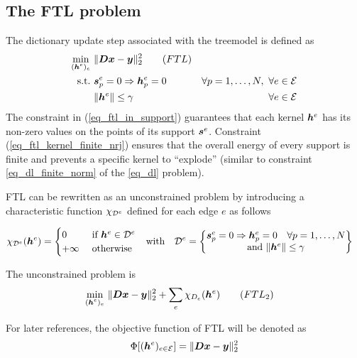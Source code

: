 \subsection{The \acs{FTL} problem}

The dictionary update step associated with the \gls{treemodel} is defined as
\begin{align}
\underset{\substack{(\bm{h}^e)_{e}}}\min ~ & \lVert \bm{D}\bm{x} - \bm{y} \rVert_2^2 \tag{$FTL$} \label{eq_ftl}\\
\text{s.t.~} & \bm{s}^e_p=0 \Rightarrow \bm{h}^e_p = 0 \quad & \forall p=1,\dots,N ,~\forall e \in \mathcal E \label{eq_ftl_in_support} \\
 & \lVert \bm{h}^e \rVert \le \gamma & \forall e \in \mathcal E\label{eq_ftl_kernel_finite_nrj}
\end{align} The constraint in (\ref{eq_ftl_in_support}) guarantees that each kernel $\bm{h}^e$ has its non-zero values on the points of its support $\bm{s}^e$. Constraint (\ref{eq_ftl_kernel_finite_nrj}) ensures that the overall energy of every support is finite and prevents a specific kernel to “explode” (similar to constraint \eqref{eq_dl_finite_norm} of the \eqref{eq_dl} problem).

\ac{FTL} can be rewritten as an unconstrained problem by introducing a characteristic function $\chi_{{\mathcal D}^e}$ defined for each edge $e$ as follows

\begin{align*}
	\chi_{{\mathcal D}^e}(\bm{h}^e) = \begin{cases} 0 &\text{ if } \bm{h}^e \in {\mathcal D}^e \\ +\infty & \ \text{otherwise}\end{cases} & \quad \text{with} \quad {\mathcal D}^e = \begin{Bmatrix} \bm{s}^e_p=0 \Rightarrow \bm{h}^e_p = 0 \quad \forall p=1,\dots,N\\ \text{and }\lVert \bm{h}^e \rVert \le \gamma \end{Bmatrix}
\end{align*}

The unconstrained problem is
\begin{align}
\underset{\substack{(\h^e)_{e}}}\min ~ & \lVert \D\x - \y \rVert_2^2 + \sum_{e}\chi_{D_e} (\h^e) \tag{${FTL}_2$} \label{eq_ftl2}
\end{align}

For later references, the objective function of \ac{FTL} will be denoted as
\begin{align}
\Phi[(\bm{h}^e)_{e \in \mathcal E}] = \lVert \bm{D}\bm{x}-\bm{y} \rVert^2_2
\end{align}

